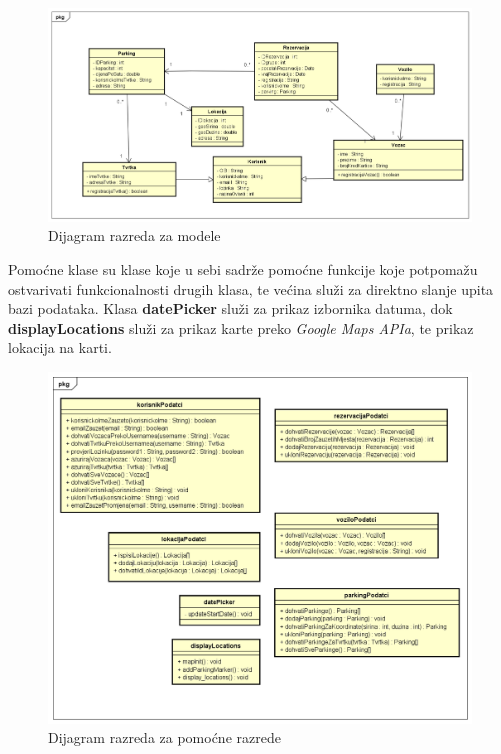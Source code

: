 			\begin{figure}[H]
				\includegraphics[scale=0.4]{dijagrami/modeli.png} %
				\centering
				\caption{Dijagram razreda za modele}
				\label{fig:promjene}
			\end{figure}
		
		
			Pomoćne klase su klase koje u sebi sadrže pomoćne funkcije koje potpomažu ostvarivati funkcionalnosti drugih klasa, te većina služi za direktno slanje upita bazi podataka. Klasa \textbf{datePicker} služi za prikaz izbornika datuma, dok \textbf{displayLocations} služi za prikaz karte preko \textit{Google Maps APIa}, te prikaz lokacija na karti.
			
			\begin{figure}[H]
				\includegraphics[scale=0.55]{dijagrami/pomocne_funkcije.png} %
				\centering
				\caption{Dijagram razreda za pomoćne razrede}
				\label{fig:promjene}
			\end{figure}
		

